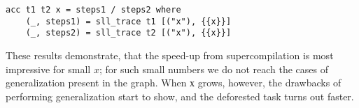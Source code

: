 \begin{lstlisting}[style=demo]
acc t1 t2 x = steps1 / steps2 where
	(_, steps1) = sll_trace t1 [("x"), {{x}}]
	(_, steps2) = sll_trace t2 [("x"), {{x}}]
\end{lstlisting}

\newpage


These results demonstrate, that the speed-up from supercompilation is most impressive
for small $x$;
for such small numbers we do not reach the cases of generalization present in the graph.
When $х$ grows, however, the drawbacks of performing generalization start to show,
and the deforested task turns out faster.

